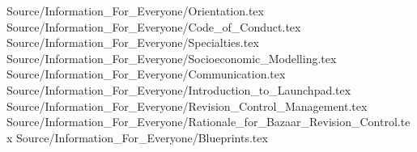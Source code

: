 

\component Source/Information_For_Everyone/Orientation.tex
\component Source/Information_For_Everyone/Code_of_Conduct.tex
\component Source/Information_For_Everyone/Specialties.tex
\component Source/Information_For_Everyone/Socioeconomic_Modelling.tex
\component Source/Information_For_Everyone/Communication.tex
\component Source/Information_For_Everyone/Introduction_to_Launchpad.tex
\component Source/Information_For_Everyone/Revision_Control_Management.tex
\component Source/Information_For_Everyone/Rationale_for_Bazaar_Revision_Control.tex
\component Source/Information_For_Everyone/Blueprints.tex



